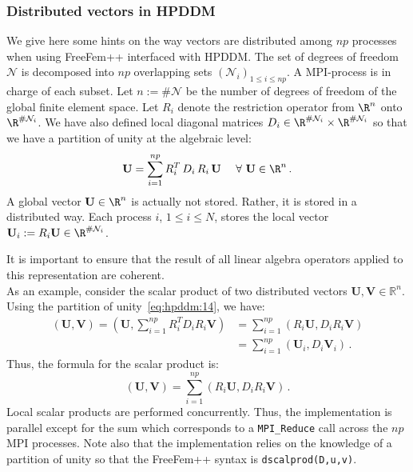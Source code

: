 \def\parallelScript{hpddm/heat-3d.edp}

\lstinput[linerange=SolvePlot-SolvePlotEnd]{\parallelScript}


\subsubsection{Distributed vectors in HPDDM} %
\label{sub:linear}
We give here some hints on the way vectors are distributed among $np$ processes when using FreeFem++ interfaced with HPDDM. The set of degrees of freedom ${\mathcal N}$ is decomposed into $np$ overlapping sets $({\mathcal N}_i)_{1\le i\le np}$. A MPI-process is in charge of each subset. Let $n:=\#{\mathcal N}$ be the number of degrees of freedom of the global finite element space. Let $R_i$ denote the restriction operator from $\R^n$ onto $\R^{\#{\mathcal N}_i}$. We have also defined local diagonal matrices $D_i\in \R^{\#{\mathcal N}_i}\times \R^{\#{\mathcal N}_i}$ so that we have a partition of unity at the algebraic level:
\begin{equation}
	\label{eq:hpddm:14}
  {\mathbf U} = \sum_{i=1}^{np} R_i^T\,D_i\,R_i\,{\mathbf U}\ \ \ \ \forall\ {\mathbf U}\in\R^n\,.
\end{equation}
A global vector ${\mathbf U}\in\R^n$ is actually not stored. Rather, it is stored in a distributed way. Each process $i$, $1\le i\le N$, stores the local vector ${\mathbf U}_i:=R_i {\mathbf U}\in \R^{\#{\mathcal N}_i}$. 

 It is important to ensure that the result of all linear algebra operators applied to this representation are coherent.\\
As an example, consider the scalar product of two distributed vectors ${\mathbf U}, {\mathbf V} \in \mathbb{R}^{n}$. Using the partition of unity~\eqref{eq:hpddm:14}, we have:
\begin{align*}({\mathbf U}, {\mathbf V}) = \left({\mathbf U}, \sum_{i=1}^{np} R_i^T D_i R_i {\mathbf V}\right) &= \sum_{i=1}^{np} (R_i {\mathbf U}, D_i R_i {\mathbf V})\\
&=\sum_{i=1}^{np} \left({\mathbf U}_i, D_i {\mathbf V}_i\right)\,. 
\end{align*}
Thus, the formula for the scalar product is:
\begin{equation*}
({\mathbf U}, {\mathbf V}) = \sum_{i = 1}^{np} (R_i {\mathbf U}, D_i R_i {\mathbf V})\,.
\end{equation*}
Local scalar products are performed concurrently. Thus, the implementation is parallel except for the sum which corresponds to a {\tt MPI\_Reduce} call across the $np$ MPI processes. Note also that the implementation relies on the knowledge of a partition of unity so that the FreeFem++ syntax is {\tt dscalprod(D,u,v)}.\\

